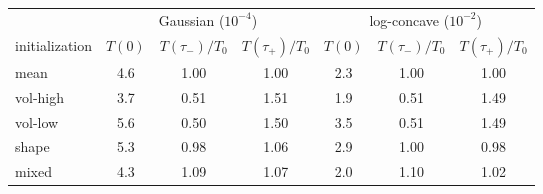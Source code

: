 \begin{tabular}{lcccccc}
\toprule
 & \multicolumn{3}{c}{Gaussian ($10^{-4}$)} & \multicolumn{3}{c}{log-concave ($10^{-2}$)} \\
\cmidrule(lr){2-4}\cmidrule(lr){5-7}
initialization & $T(0)$ & $T(\tau_-)/T_0$ & $T(\tau_+)/T_0$ & $T(0)$ & $T(\tau_-)/T_0$ & $T(\tau_+)/T_0$ \\
\midrule
mean & 4.6 & 1.00 & 1.00 & 2.3 & 1.00 & 1.00 \\
vol-high & 3.7 & 0.51 & 1.51 & 1.9 & 0.51 & 1.49 \\
vol-low & 5.6 & 0.50 & 1.50 & 3.5 & 0.51 & 1.49 \\
shape & 5.3 & 0.98 & 1.06 & 2.9 & 1.00 & 0.98 \\
mixed & 4.3 & 1.09 & 1.07 & 2.0 & 1.10 & 1.02 \\
\bottomrule
\end{tabular}

